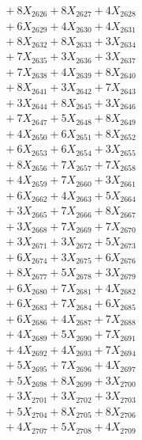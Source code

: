\documentclass[a4paper,10pt]{article}
\begin{document}
{\begin{align}
&\;  + 8 X_{2626} + 8 X_{2627} + 4 X_{2628} \\[0.3ex]
&\;  + 6 X_{2629} + 4 X_{2630} + 4 X_{2631} \\[0.3ex]
&\;  + 8 X_{2632} + 8 X_{2633} + 3 X_{2634} \\[0.3ex]
&\;  + 7 X_{2635} + 3 X_{2636} + 3 X_{2637} \\[0.3ex]
&\;  + 7 X_{2638} + 4 X_{2639} + 8 X_{2640} \\[0.3ex]
&\;  + 8 X_{2641} + 3 X_{2642} + 7 X_{2643} \\[0.3ex]
&\;  + 3 X_{2644} + 8 X_{2645} + 3 X_{2646} \\[0.3ex]
&\;  + 7 X_{2647} + 5 X_{2648} + 8 X_{2649} \\[0.5ex]\allowbreak
&\;  + 4 X_{2650} + 6 X_{2651} + 8 X_{2652} \\[0.3ex]
&\;  + 6 X_{2653} + 6 X_{2654} + 3 X_{2655} \\[0.3ex]
&\;  + 8 X_{2656} + 7 X_{2657} + 7 X_{2658} \\[0.3ex]
&\;  + 4 X_{2659} + 7 X_{2660} + 3 X_{2661} \\[0.3ex]
&\;  + 6 X_{2662} + 4 X_{2663} + 5 X_{2664} \\[0.3ex]
&\;  + 3 X_{2665} + 7 X_{2666} + 8 X_{2667} \\[0.3ex]
&\;  + 3 X_{2668} + 7 X_{2669} + 7 X_{2670} \\[0.3ex]
&\;  + 3 X_{2671} + 3 X_{2672} + 5 X_{2673} \\[0.3ex]
&\;  + 6 X_{2674} + 3 X_{2675} + 6 X_{2676} \\[0.3ex]
&\;  + 8 X_{2677} + 5 X_{2678} + 3 X_{2679} \\[0.5ex]\allowbreak
&\;  + 6 X_{2680} + 7 X_{2681} + 4 X_{2682} \\[0.3ex]
&\;  + 6 X_{2683} + 7 X_{2684} + 6 X_{2685} \\[0.3ex]
&\;  + 6 X_{2686} + 4 X_{2687} + 7 X_{2688} \\[0.3ex]
&\;  + 4 X_{2689} + 5 X_{2690} + 7 X_{2691} \\[0.3ex]
&\;  + 4 X_{2692} + 4 X_{2693} + 7 X_{2694} \\[0.3ex]
&\;  + 5 X_{2695} + 7 X_{2696} + 4 X_{2697} \\[0.3ex]
&\;  + 5 X_{2698} + 8 X_{2699} + 3 X_{2700} \\[0.3ex]
&\;  + 3 X_{2701} + 3 X_{2702} + 3 X_{2703} \\[0.3ex]
&\;  + 5 X_{2704} + 8 X_{2705} + 8 X_{2706} \\[0.3ex]
&\;  + 4 X_{2707} + 5 X_{2708} + 4 X_{2709} \\[0.5ex]\allowbreak

\end{align}}
\end{document}
